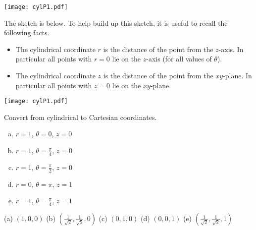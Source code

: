 \begin{answer}
\begin{center}
   \texttt{[image: cylP1.pdf]}
\end{center}
\end{answer}

\begin{solution}
The sketch is below. To help build up this sketch, it is useful to 
recall the following facts.
\begin{itemize}
\item
The cylindrical coordinate $r$ is the distance of the point from the $z$-axis.
In particular all points with $r=0$ lie on the $z$-axis (for all values of $\theta$).
\item
The cylindrical coordinate $z$ is the distance of the point from the $xy$-plane.
In particular all points with $z=0$ lie on the $xy$-plane.
\end{itemize}
\begin{center}
   \texttt{[image: cylP1.pdf]}
\end{center}
\end{solution}

\begin{question}
Convert from cylindrical to Cartesian coordinates.
\begin{enumerate}[(a)]
\item
$r=1$, $\theta=0$, $z=0$
\item
$r=1$, $\theta=\frac{\pi}{4}$, $z=0$
\item
$r=1$, $\theta=\frac{\pi}{2}$, $z=0$
\item
$r=0$, $\theta=\pi$, $z=1$
\item
$r=1$, $\theta=\frac{\pi}{4}$, $z=1$
\end{enumerate}

\end{question}

%

\begin{answer}
(a) $(1,0,0)$\qquad
(b) $\left(\frac{1}{\sqrt{2}},\frac{1}{\sqrt{2}},0\right)$\qquad
(c) $(0,1,0)$\qquad
(d) $(0,0,1)$\qquad
(e) $\left(\frac{1}{\sqrt{2}},\frac{1}{\sqrt{2}},1\right)$
\end{answer}

